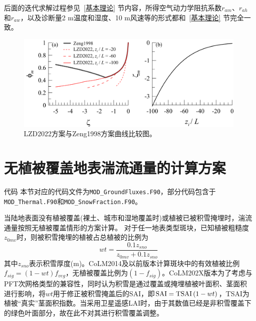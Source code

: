 后面的迭代求解过程参见~\ref{基本理论} 节内容，所得空气动力学阻抗系数$r_{am}$、$r_{ah}$和$r_{aw}$，以及诊断量2 m温度和湿度、10 m风速等的形式都和~\ref{基本理论} 节完全一致。
{
\begin{figure}[htbp]
\centering
\includegraphics[scale=0.7]{Figures/地表湍流交换过程/LZD2022方案与Zeng1998方案曲线比较图.png}
\caption{LZD2022方案与Zeng1998方案曲线比较图。}
\label{fig:LZD2022方案与Zeng1998方案曲线比较图}
\end{figure}
}


\section{无植被覆盖地表湍流通量的计算方案}\label{无植被覆盖地表湍流通量的计算方案}
\begin{mymdframed}{代码}
本节对应的代码文件为\texttt{MOD\_GroundFluxes.F90}，部分代码包含于\texttt{MOD\_Thermal.F90}和\texttt{MOD\_SnowFraction.F90}。
\end{mymdframed}

当陆地表面没有植被覆盖(裸土、城市和湿地覆盖时)或植被已被积雪掩埋时，湍流通量按照无植被覆盖情形的方案计算。
对于任一地表类型斑块，已知植被粗糙度$z_{0mv}$时，则被积雪掩埋的植被占总植被的比例为
\begin{equation}
wt=\frac{0.1 z_{{sno}}}{z_{0mv}+0.1 z_{{sno}}}
\end{equation}
其中$z_{sno}$表示积雪厚度(m)。CoLM2014及以前版本计算斑块中的有效植被比例$f_{sig}=\left(1-wt\right)f_{veg}$，无植被覆盖比例为$\left(1-f_{sig}\right)$。CoLM202X版本为了考虑与PFT次网格类型的兼容性，同时认为积雪是通过覆盖或掩埋植被叶面积、茎面积进行影响，将$wt$用于修正被积雪掩盖后的SAI，即${\rm SAI=TSAI}\left(1-wt\right)$，TSAI为植被“真实”茎面积指数。当采用卫星遥感LAI时，由于其数值已经是非积雪覆盖下的绿色叶面部分，故在此不对其进行积雪覆盖调整。


